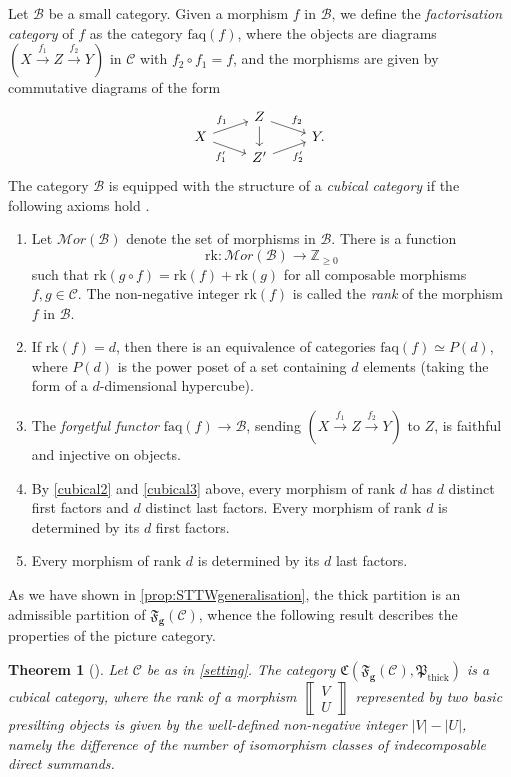 \documentclass[10pt,twoside, a4paper,reqno]{amsart}
\DeclareMathOperator{\thick}{thick}
\newcommand{\partfan}[1]{\mathfrak{F}_{\bfg}(#1)}
\newcommand{\catof}{\mathfrak{C}}
\newcommand{\sqbinom}[2]{\left\llbracket \!\begin{smallmatrix} #1 \\ #2 \end{smallmatrix}\!\right\rrbracket}
\newcommand{\Pfrak}{\mathfrak{P}}
\newcommand{\calB}{\mathcal{B}}
\newcommand{\calC}{\mathcal{C}}
\newcommand{\bfg}{\mathbf{g}}
\newcommand{\Z}{\mathbb{Z}}
\newtheorem{theorem}{Theorem}[section]
\theoremstyle{definition}
\begin{document}
Let $\calB$ be a small category. Given a morphism $f$ in $\calB$, we define the \textit{factorisation category} of $f$ as the category $\mathrm{faq}(f)$, where the objects are diagrams $(X  \xrightarrow{f_1} Z \xrightarrow{f_2} Y)$ in $\calC$ with $f_2\circ f_1=f$, and the morphisms are given by commutative diagrams of the form 
\begin{equation*}
    \begin{tikzcd}[row sep=0.025em]
 & Z\arrow[dd]\arrow[rd,"f_2"] & \\
X\arrow[ru,"f_1"]\arrow[rd,"f'_1"']& & Y.\\
 & Z' \arrow[ru,"f'_2"']&
\end{tikzcd}
\end{equation*}
The category $\calB$ is equipped with the structure of {a} \textit{cubical category} if the following axioms hold \cite[§3.1]{Igu14}.
\begin{enumerate}[label=($\mathbf{C \arabic*}$)]
    \item\label{cubical1} 
    Let $\mathcal{M}or(\calB)$ denote the set of morphisms in $\calB$. There is a function
    \begin{equation*}
        \mathrm{rk}\colon \mathcal{M}or(\calB) \to \Z_{\geq 0}
    \end{equation*}
    such that $\mathrm{rk}(g\circ f) = \mathrm{rk}(f)+\mathrm{rk}(g)$ for all composable morphisms $f,g \in \calC$. 
    The non-negative integer $\mathrm{rk}(f)$ is called the \textit{rank} of the morphism $f$ in $\calB$. 
    \item\label{cubical2} If $\mathrm{rk}(f) = d$, then there is an equivalence of categories $\mathrm{faq}(f) \simeq P(d)$, where $P(d)$ is the power poset of a set containing $d$ elements (taking the form of a $d$-dimensional hypercube).
    \item\label{cubical3} The \textit{forgetful functor} $\mathrm{faq}(f) \to \calB$, sending $(X  \xrightarrow{f_1} Z \xrightarrow{f_2} Y)$ to $Z$, is faithful and injective on objects.  
    \item\label{cubical4}
    By \ref{cubical2} and \ref{cubical3} above, every morphism of rank $d$ has $d$ distinct first factors and $d$ distinct last factors.
    Every morphism of rank $d$ is determined by its $d$ first factors. 
    \item\label{cubical5} 	Every morphism of rank $d$ is determined by its $d$ last factors.
\end{enumerate}

As we have shown in \cref{prop:STTWgeneralisation}, the thick partition is an admissible partition of $\partfan{\calC}$, whence the following result describes the properties of the picture category. 
\begin{theorem}[{\cite[{Thm.} 3.16]{Kai23}}]
    Let $\calC$ be as in \cref{setting}. The category $\catof(\partfan{\calC}, \Pfrak_{\thick})$ is a cubical category, where the rank of a morphism $\sqbinom{V}{U}$ {represented by two basic presilting objects} is given by the well-defined non-negative integer $|V|-|U|$, namely the difference of the number of isomorphism classes of indecomposable direct summands.
\end{theorem}
\end{document}
